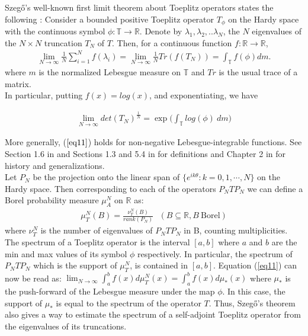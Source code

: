 \documentclass[article]{amsart}
\begin{document}
Szegő's well-known first limit theorem about Toeplitz operators states the following \cite{MR1544404}: Consider a bounded positive Toeplitz operator $T_{\phi}$ on the Hardy space with the continuous symbol $\phi: \mathbb{T} \rightarrow \mathbb{R}$. Denote by $\lambda_1, \lambda_2,..\lambda_N$, the $N$ eigenvalues of the $N \times N$ truncation $T_N$ of $T$. Then, for a continuous function $f: \mathbb{R} \rightarrow \mathbb{R}$,
\begin{align}\label{eq11}
    \lim_{N \rightarrow \infty} \frac{1}{N} \sum_{i=1}^{N} f(\lambda_i) = \lim_{N \rightarrow \infty} \frac{1}{N} Tr(f(T_N)) =  \int_{\mathbb{T}} f(\phi) dm.
\end{align}
where $m$ is the normalized Lebesgue measure on $\mathbb{T}$ and $Tr$ is the usual trace of a matrix.\\

In particular, putting $f(x) = log(x)$, and exponentiating, we have

\begin{align}\label{eq12}
    \lim_{N \rightarrow \infty} det(T_N)^{\frac{1}{N}} = \exp\Big( \int_{\mathbb{T}} log(\phi) \  dm \Big)
\end{align}

More generally, ($\ref{eq11}$) holds for non-negative Lebesgue-integrable functions. See Section 1.6 in \cite{MR2105088} and Sections 1.3 and 5.4 in \cite{MR2223704} for definitions and Chapter 2 in \cite{MR2105088} for history and generalizations.\\


Let $P_N$ be the projection onto the linear span of $\{e^{ik \theta}: k=0,1,\cdots,N\}$ on the Hardy space. Then corresponding to each of the operators $P_N TP_N$ we can define a Borel probability measure $\mu_A^N$ on $\mathbb{R}$ as:
\begin{align} \label{eq15}
\mu_T^N(B) = \frac{\nu_T^N(B)}{rank (P_N)} \ \ \ (B \subseteq \mathbb{R}, B \ \text{Borel})
\end{align}
where $\nu_T^N$ is the number of eigenvalues of $P_N T P_N$ in B, counting multiplicities.\\

The spectrum of a Toeplitz operator is the interval $[a,b]$ where $a$ and $b$ are the min and max values of its symbol $\phi$ respectively. In particular, the spectrum of $P_N T P_N$ which is the support of $\mu_T^N$, is contained in $[a,b]$. Equation (\ref{eq11}) can now be read as: $\lim_{N \rightarrow \infty} \int_{a}^{b} f(x) d\mu_T^N(x) = \int_{a}^{b} f(x) d \mu_*(x)$ where $\mu_*$ is the push-forward of the Lebesgue measure under the map $\phi$. In this case, the support of $\mu_*$ is equal to the spectrum of the operator $T$. Thus, Szeg\H{o}'s theorem also gives a way to estimate the spectrum of a self-adjoint Toeplitz operator from the eigenvalues of its truncations.\\
\end{document}
